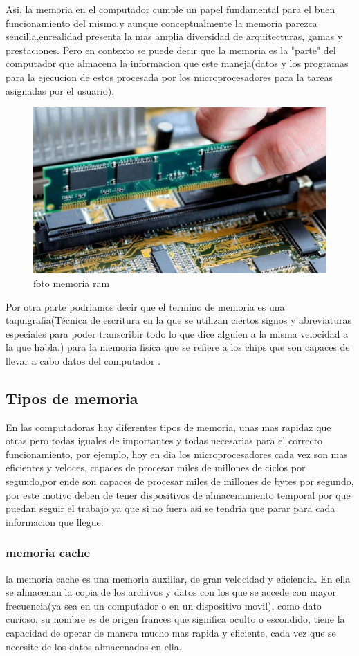 \documentclass{article}
\begin{document}
    Asi, la memoria en el computador cumple un papel fundamental para el buen funcionamiento del mismo.y aunque conceptualmente la memoria parezca sencilla,enrealidad presenta la mas amplia diversidad de arquitecturas, gamas y prestaciones\cite{academia}.
    Pero en contexto se puede decir que la memoria es la "parte" del computador que almacena la informacion que este maneja(datos y los programas para la ejecucion de estos procesada por los microprocesadores para la tareas asignadas por el usuario).\cite{academia}

    \begin{figure}[h]
    \includegraphics[width=6 cm]{imagenes/tipo_memoria.jpg}
    \centering
    \caption{foto memoria ram}
    \label{fig:tipo_memoria}
    \end{figure}

    Por otra parte podriamos decir que el termino de memoria es una taquigrafia(Técnica de escritura en la que se utilizan ciertos signos y abreviaturas especiales para poder transcribir todo lo que dice alguien a la misma velocidad a la que habla.) para la memoria fisica que se refiere a los chips que son capaces de llevar a cabo datos del computador \cite{monografias}.
    
    \subsection{Tipos de memoria}
    En las computadoras hay diferentes tipos de memoria, unas mas rapidaz que otras pero todas iguales de importantes y todas necesarias para el correcto funcionamiento, por ejemplo, hoy en dia los microprocesadores cada vez son mas eficientes y veloces, capaces de procesar miles de millones de ciclos por segundo,por ende son capaces de procesar miles de millones de bytes por segundo, por este motivo deben de tener dispositivos de almacenamiento temporal por que puedan seguir el trabajo ya que si no fuera asi se tendria que parar para cada informacion que llegue.\cite{profe}
    
        \subsubsection{memoria cache}
        la memoria cache es una memoria auxiliar, de gran velocidad y eficiencia. En ella se almacenan la copia de los archivos y datos con los que se accede con mayor frecuencia(ya sea en un computador o en un dispositivo movil),
        como dato curioso, su nombre es de origen frances que significa oculto o escondido, tiene la capacidad de operar de manera mucho mas rapida y eficiente, cada vez que se necesite de los datos almacenados en ella.\cite{academia1}
        
\end{document}
